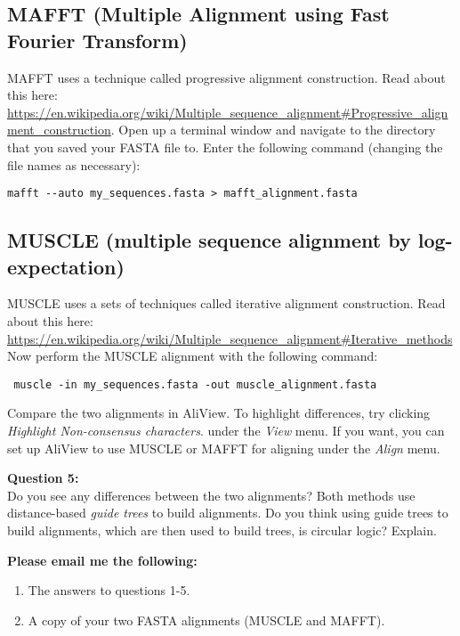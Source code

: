 \documentclass[11pt]{article}
\begin{document}
\subsection{MAFFT (Multiple Alignment using Fast Fourier Transform)}

MAFFT uses a technique called progressive alignment construction.
Read about this here: 
\url{https://en.wikipedia.org/wiki/Multiple_sequence_alignment#Progressive_alignment_construction}.
Open up a terminal window and navigate to the directory
that you saved your FASTA file to. Enter the following
command (changing the file names as necessary):

\begin{verbatim}
mafft --auto my_sequences.fasta > mafft_alignment.fasta
\end{verbatim}

\subsection{MUSCLE (multiple sequence alignment by log-expectation)}

MUSCLE uses a sets of techniques called iterative alignment construction.
Read about this here:
\url{https://en.wikipedia.org/wiki/Multiple_sequence_alignment#Iterative_methods}
Now perform the MUSCLE alignment with the following command:

\begin{verbatim}
 muscle -in my_sequences.fasta -out muscle_alignment.fasta
 \end{verbatim}

Compare the two alignments in AliView.
To highlight differences, try clicking
\textit{Highlight Non-consensus characters}.
under the \textit{View} menu.
If you want, you can set up AliView to use MUSCLE or MAFFT
for aligning under the \textit{Align} menu.

\begin{framed}
\noindent
\textbf{Question 5:} \\
Do you see any differences between the two alignments?
Both methods use distance-based \textit{guide trees} to build alignments.
Do you think using guide trees to build alignments,
which are then used to build trees, is circular logic? Explain.
\end{framed}

\begin{framed}
\noindent
\textbf{Please email me the following:}
\begin{enumerate}
  \item The answers to questions 1-5.
  \item A copy of your two FASTA alignments (MUSCLE and MAFFT).
\end{enumerate}
\end{framed}

\printbibliography
\end{document}
